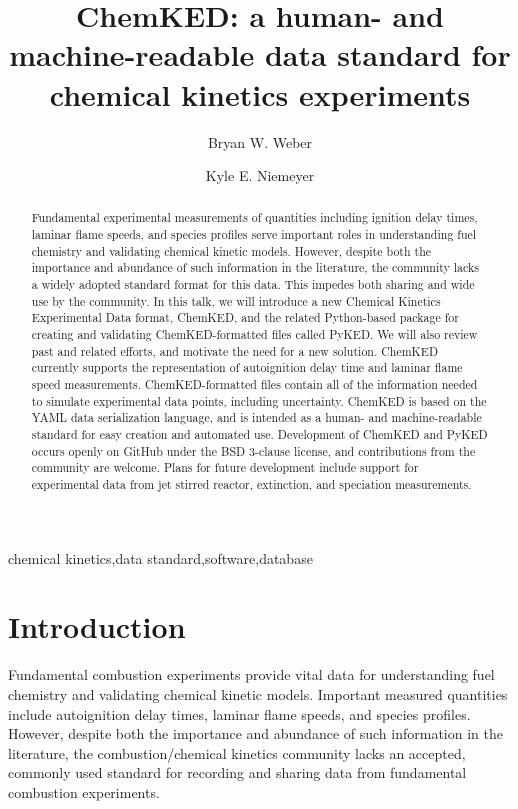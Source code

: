 \documentclass[12pt]{ussci}
\title{ ChemKED: a human- and machine-readable data standard for chemical kinetics experiments }
\author[1*]{Bryan W. Weber}
\author[2]{Kyle E. Niemeyer}
\affil[1]{Department of Mechanical Engineering, University of Connecticut, Storrs, CT, USA}
\affil[2]{School of Mechanical, Industrial, and Manufacturing Engineering, Oregon State University, Corvallis, OR, USA}
\affil[*]{Corresponding author: \email{bryan.weber@uconn.edu}}
\begin{document}
\maketitle

\begin{abstract} %
Fundamental experimental measurements of quantities including ignition delay
times, laminar flame speeds, and species profiles serve important roles in
understanding fuel chemistry and validating chemical kinetic models. However,
despite both the importance and abundance of such information in the literature,
the community lacks a widely adopted standard format for this data. This impedes
both sharing and wide use by the community. In this talk, we will introduce a
new Chemical Kinetics Experimental Data format, ChemKED, and the related
Python-based package for creating and validating ChemKED-formatted files called
PyKED. We will also review past and related efforts, and motivate the need for a
new solution. ChemKED currently supports the representation of autoignition
delay time and laminar flame speed measurements. ChemKED-formatted files contain
all of the information needed to simulate experimental data points, including
uncertainty. ChemKED is based on the YAML data serialization language, and is
intended as a human- and machine-readable standard for easy creation and
automated use. Development of ChemKED and PyKED occurs openly on GitHub under
the BSD 3-clause license, and contributions from the community are welcome.
Plans for future development include support for experimental data from jet
stirred reactor, extinction, and speciation measurements.
\end{abstract}

\begin{keyword}
    chemical kinetics\sep data standard\sep software\sep database
\end{keyword}

\section{Introduction}
%
Fundamental combustion experiments provide vital data for understanding
fuel chemistry and validating chemical kinetic models. Important measured quantities
include autoignition delay times, laminar flame speeds, and species profiles.
However, despite both the importance and abundance of such information in the literature,
the combustion\slash chemical kinetics community lacks an accepted, commonly used
standard for recording and sharing data from fundamental combustion experiments.
\end{document}
